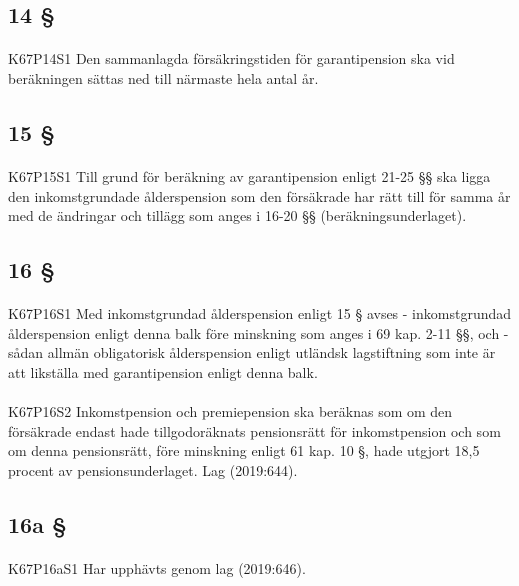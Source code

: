 \documentclass[a4paper,notitlepage,openany,10pt]{book}
\begin{document}
\subsection*{14 §}
\paragraph*{}
{\tiny K67P14S1}
Den sammanlagda försäkringstiden för garantipension ska vid beräkningen sättas ned till närmaste hela antal år.
\subsection*{15 §}
\paragraph*{}
{\tiny K67P15S1}
Till grund för beräkning av garantipension enligt 21-25 §§ ska ligga den inkomstgrundade ålderspension som den försäkrade har rätt till för samma år med de ändringar och tillägg som anges i 16-20 §§ (beräkningsunderlaget).
\subsection*{16 §}
\paragraph*{}
{\tiny K67P16S1}
Med inkomstgrundad ålderspension enligt 15 § avses
\newline - inkomstgrundad ålderspension enligt denna balk före minskning som anges i 69 kap. 2-11 §§, och
\newline - sådan allmän obligatorisk ålderspension enligt utländsk lagstiftning som inte är att likställa med garantipension enligt denna balk.
\paragraph*{}
{\tiny K67P16S2}
Inkomstpension och premiepension ska beräknas som om den försäkrade endast hade tillgodoräknats pensionsrätt för inkomstpension och som om denna pensionsrätt, före minskning enligt 61 kap. 10 §, hade utgjort 18,5 procent av pensionsunderlaget.
Lag (2019:644).
\subsection*{16a §}
\paragraph*{}
{\tiny K67P16aS1}
Har upphävts genom
lag (2019:646).
\end{document}

